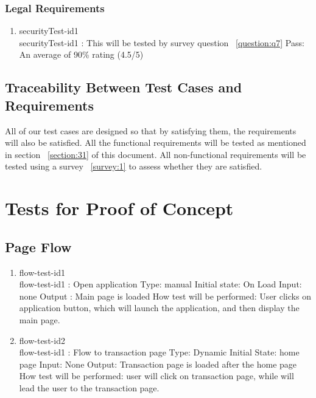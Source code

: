 \documentclass[12pt, titlepage]{article}
\begin{document}
\subsubsection{ Legal Requirements}
\begin{enumerate}
\item{securityTest-id1\\}
securityTest-id1 : This will be tested by survey question ~\ref{question:q7}
\newline
	Pass: An average of 90\% rating (4.5/5)


\end{enumerate}

\subsection{Traceability Between Test Cases and Requirements}
All of our test cases are designed so that by satisfying them, the requirements will also be satisfied. All the functional requirements will be tested as mentioned in section ~\ref{section:31} of this document. All non-functional requirements will be tested using a survey ~\ref{survey:1} to assess whether they are satisfied.

\section{Tests for Proof of Concept}

\subsection{Page Flow}

\begin{enumerate}

\item{flow-test-id1\\}
flow-test-id1 : Open application
\newline
Type: manual 
\newline
Initial state: On Load 
\newline
Input: none
\newline
Output : Main page is loaded 
\newline
How test will be performed: User clicks on application button, which will launch the application, and then display the main page. 



					
\item{flow-test-id2\\}
flow-test-id1 : Flow to transaction page
\newline
Type: Dynamic
\newline
Initial State: home page 
\newline
Input: None
\newline
Output: Transaction page is loaded after the home page 
\newline
How test will be performed:  user will click on transaction page, while will lead the user to the transaction page. 



\end{enumerate}
\end{document}
